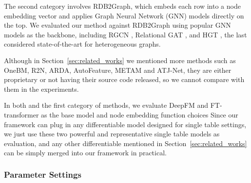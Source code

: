The second category involves RDB2Graph, which embeds each row into a node embedding vector and applies Graph Neural Network (GNN) models directly on the top. We evaluated our method against RDB2Graph using popular GNN models as the backbone, including RGCN \cite{schlichtkrull2018modeling}, Relational GAT \cite{busbridge2019relational}, and HGT \cite{hu2020heterogeneous}, the last considered state-of-the-art for heterogeneous graphs.

Although in Section~\ref{sec:related_works} we mentioned 
more methods such as OneBM\cite{lam2017one}, R2N\cite{lam2018neural}, ARDA\cite{arda}, AutoFeature\cite{liu2022feature}, METAM \cite{galhotra2023metam} and ATJ-Net\cite{bai2021atj},  they are either proprietary or not having their source code released, so we cannot compare with them in the experiments.

In both \model{} and the first category of methods, we evaluate DeepFM \cite{guo2017deepfm} and FT-transformer \cite{gorishniy2021revisiting} as the base model and node embedding function choices 
Since our framework can plug in any differentiable model designed for single table settings, we just use these two powerful and representative single table models as evaluation, and any other differentiable mentioned in Section~\ref{sec:related_works} can be simply merged into our framework in practical.

\subsubsection{Parameter Settings}

